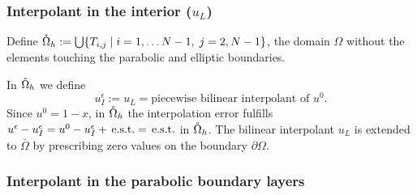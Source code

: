 \documentclass{article}
\newcommand{\est}{\text{\,e.s.t.}\xspace}
\newcommand{\T}{\ensuremath{\mathcal{T}}\xspace}
\newcommand{\ueps}{u^\epsilon}
\begin{document}


\subsubsection{Interpolant in the interior ($u_L$)} 



Define ${\mathaccent 23 \Omega}_h := \bigcup \{T_{i,j} \;|\; i=1, \dots N-1,\; j=2,N-1\}$, the domain $\Omega$
without the elements touching the parabolic and elliptic boundaries.

In ${\mathaccent 23 \Omega}_h$ we define
$$
\ueps_I := u_L = \text{piecewise bilinear interpolant of } u^0.
$$
Since $u^0 = 1-x$, in ${\mathaccent 23 \Omega}_h$ the interpolation error fulfills 
$\ueps - \ueps_I = u^0 - \ueps_I + \est = \est$ in ${\mathaccent 23 \Omega}_h$.
The bilinear interpolant $u_L$ is extended to $\bar{\Omega}$ by prescribing zero values on the boundary $\partial\Omega$. 

\subsubsection{Interpolant in the parabolic boundary layers}




\end{document}
